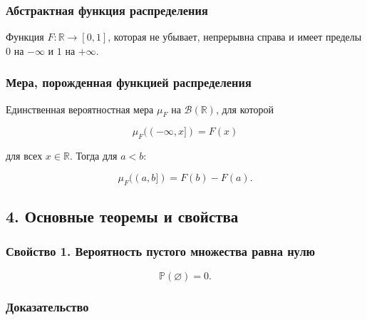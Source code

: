 \documentclass[
  11pt,
  a4paper,
]{article}
\begin{document}
\subsubsection{Абстрактная функция
распределения}\label{ux430ux431ux441ux442ux440ux430ux43aux442ux43dux430ux44f-ux444ux443ux43dux43aux446ux438ux44f-ux440ux430ux441ux43fux440ux435ux434ux435ux43bux435ux43dux438ux44f}

Функция \(F:\mathbb R\to[0,1]\), которая не убывает, непрерывна справа и
имеет пределы \(0\) на \(-\infty\) и \(1\) на \(+\infty\).

\subsubsection{Мера, порожденная функцией
распределения}\label{ux43cux435ux440ux430-ux43fux43eux440ux43eux436ux434ux435ux43dux43dux430ux44f-ux444ux443ux43dux43aux446ux438ux435ux439-ux440ux430ux441ux43fux440ux435ux434ux435ux43bux435ux43dux438ux44f}

Единственная вероятностная мера \(\mu_F\) на \(\mathcal B(\mathbb R)\),
для которой

\[
\mu_F((-\infty,x])=F(x)
\]

для всех \(x\in\mathbb R\). Тогда для \(a<b\):

\[
\mu_F((a,b])=F(b)-F(a).
\]

\subsection{4. Основные теоремы и
свойства}\label{ux43eux441ux43dux43eux432ux43dux44bux435-ux442ux435ux43eux440ux435ux43cux44b-ux438-ux441ux432ux43eux439ux441ux442ux432ux430}

\subsubsection{Свойство 1. Вероятность пустого множества равна
нулю}\label{ux441ux432ux43eux439ux441ux442ux432ux43e-1.-ux432ux435ux440ux43eux44fux442ux43dux43eux441ux442ux44c-ux43fux443ux441ux442ux43eux433ux43e-ux43cux43dux43eux436ux435ux441ux442ux432ux430-ux440ux430ux432ux43dux430-ux43dux443ux43bux44e}

\[
\mathbb P(\varnothing)=0.
\]

\subsubsection{Доказательство}\label{ux434ux43eux43aux430ux437ux430ux442ux435ux43bux44cux441ux442ux432ux43e}
\end{document}
